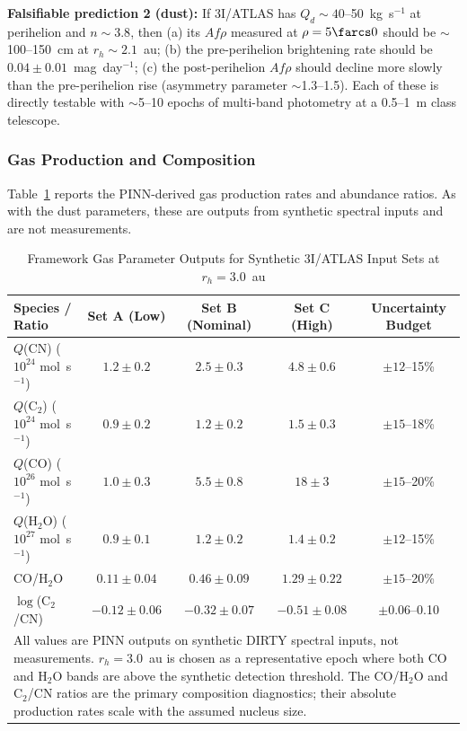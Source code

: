 \documentclass[usenatbib]{mnras}
\begin{document}
\textbf{Falsifiable prediction 2 (dust):} If 3I/ATLAS has $Q_d \sim 40$--50~kg~s$^{-1}$ at perihelion and $n \sim 3.8$, then (a) its $Af\rho$ measured at $\rho = 5\farcs0$ should be $\sim$100--150~cm at $r_h \sim 2.1$~au; (b) the pre-perihelion brightening rate should be $0.04 \pm 0.01$~mag~day$^{-1}$; (c) the post-perihelion $Af\rho$ should decline more slowly than the pre-perihelion rise (asymmetry parameter $\sim$1.3--1.5). Each of these is directly testable with $\sim$5--10 epochs of multi-band photometry at a 0.5--1~m class telescope.

\subsubsection{Gas Production and Composition}

Table~\ref{tab:gas_results} reports the PINN-derived gas production rates and abundance ratios. As with the dust parameters, these are outputs from synthetic spectral inputs and are not measurements.

\begin{table}
\centering
\caption{Framework Gas Parameter Outputs for Synthetic 3I/ATLAS Input Sets at $r_h = 3.0$~au\label{tab:gas_results}}
\begin{tabular}{lcccc}
\toprule
Species / Ratio & Set A (Low) & Set B (Nominal) & Set C (High) & Uncertainty Budget \\
\midrule
$Q$(CN) ($10^{24}$ mol~s$^{-1}$) & $1.2 \pm 0.2$ & $2.5 \pm 0.3$ & $4.8 \pm 0.6$ & $\pm 12$--15\% \\
$Q$(C$_2$) ($10^{24}$ mol~s$^{-1}$) & $0.9 \pm 0.2$ & $1.2 \pm 0.2$ & $1.5 \pm 0.3$ & $\pm 15$--18\% \\
$Q$(CO) ($10^{26}$ mol~s$^{-1}$) & $1.0 \pm 0.3$ & $5.5 \pm 0.8$ & $18 \pm 3$ & $\pm 15$--20\% \\
$Q$(H$_2$O) ($10^{27}$ mol~s$^{-1}$) & $0.9 \pm 0.1$ & $1.2 \pm 0.2$ & $1.4 \pm 0.2$ & $\pm 12$--15\% \\
CO/H$_2$O & $0.11 \pm 0.04$ & $0.46 \pm 0.09$ & $1.29 \pm 0.22$ & $\pm 15$--20\% \\
$\log$(C$_2$/CN) & $-0.12 \pm 0.06$ & $-0.32 \pm 0.07$ & $-0.51 \pm 0.08$ & $\pm 0.06$--0.10 \\
\bottomrule
\multicolumn{5}{l}{\small All values are PINN outputs on synthetic DIRTY spectral inputs, not measurements. $r_h = 3.0$~au is chosen as a representative epoch where both CO and H$_2$O bands are above the synthetic detection threshold. The CO/H$_2$O and C$_2$/CN ratios are the primary composition diagnostics; their absolute production rates scale with the assumed nucleus size.}
\end{tabular}
\end{table}
\end{document}
